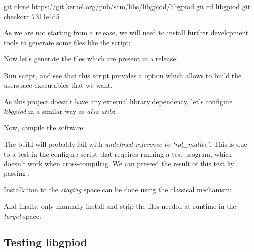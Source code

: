 \begin{bashinput}
git clone https://git.kernel.org/pub/scm/libs/libgpiod/libgpiod.git
cd libgpiod
git checkout 7311e1d5
\end{bashinput}

As we are not starting from a release, we will need to install
further development tools to generate some files like the
 script:


Now let's generate the files which are present in a release:


Run  script, and see that this script provides
a  option which allows to build the userspace
executables that we want.

As this project doesn't have any external library dependency, let's
configure {\em libgpiod} in a similar way as {\em alsa-utils}:


Now, compile the software:


The build will probably fail with {\em undefined reference to
`rpl\_malloc'}. This is due to a test in the configure script that
requires running a test program, which doesn't work when
cross-compiling. We can preseed the result of this test by passing
:


Installation to the {\em staging} space can be done using the
classical  mechanism:


And finally, only manually install and strip the files
needed at runtime in the {\em target} space:


\subsection{Testing libgpiod}

